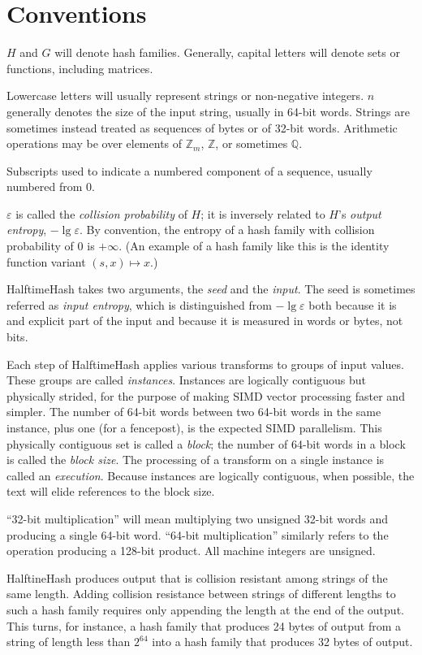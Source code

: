 \documentclass[sigconf, nonacm]{acmart}
\newcommand{\rats}{\mathbb{Q}}
\newcommand{\ints}{\mathbb{Z}}
\begin{document}
\section{Conventions}

$H$ and $G$ will denote hash families.
Generally, capital letters will denote sets or functions, including matrices.

Lowercase letters will usually represent strings or non-negative integers.
$n$ generally denotes the size of the input string, usually in 64-bit words.
Strings are sometimes instead treated as sequences of bytes or of 32-bit words.
Arithmetic operations may be over elements of $\ints_m$, $\ints$, or sometimes $\rats$.

Subscripts used to indicate a numbered component of a sequence, usually numbered from 0.

$\varepsilon$ is called the {\em collision probability} of $H$; it is inversely related to $H$'s {\em output entropy}, $-\lg \varepsilon$.
By convention, the entropy of a hash family with collision probability of $0$ is $+\infty$.
(An example of a hash family like this is the identity function variant $(s, x) \mapsto x$.)

HalftimeHash takes two arguments, the {\em seed} and the {\em input}.
The seed is sometimes referred as {\em input entropy}, which is distinguished from $-\lg \varepsilon$ both because it is and explicit part of the input and because it is measured in words or bytes, not bits.

Each step of HalftimeHash applies various transforms to groups of input values.
These groups are called {\em instances}.
Instances are logically contiguous but physically strided, for the purpose of making SIMD vector processing faster and simpler.
The number of 64-bit words between two 64-bit words in the same instance, plus one (for a fencepost), is the expected SIMD parallelism.
This physically contiguous set is called a {\em block}; the number of 64-bit words in a block is called the {\em block size}.
The processing of a transform on a single instance is called an {\em execution}.
Because instances are logically contiguous, when possible, the text will elide references to the block size.

``32-bit multiplication'' will mean multiplying two unsigned 32-bit words and producing a single 64-bit word.
``64-bit multiplication'' similarly refers to the operation producing a 128-bit product.
All machine integers are unsigned.

HalftineHash produces output that is collision resistant among strings of the same length.
Adding collision resistance between strings of different lengths to such a hash family requires only appending the length at the end of the output.
This turns, for instance, a hash family that produces 24 bytes of output from a string of length less than $2^{64}$ into a hash family that produces 32 bytes of output.
\end{document}

